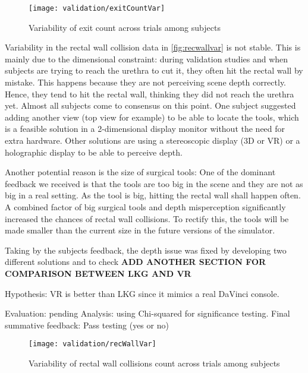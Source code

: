 \begin{figure}
  \centering
  \texttt{[image: validation/exitCountVar]}
  \caption{Variability of exit count across trials among subjects}
  \label{fig:exitvar}
\end{figure}

Variability in the rectal wall collision data in \autoref{fig:recwallvar} is not stable. This is mainly due to the dimensional constraint: during validation studies and when subjects are trying to reach the urethra to cut it, they often hit the rectal wall by mistake. This happens because they are not perceiving scene depth correctly. Hence, they tend to hit the rectal wall, thinking they did not reach the urethra yet. Almost all subjects come to consensus on this point. One subject suggested adding another view (top view for example) to be able to locate the tools, which is a feasible solution in a 2-dimensional display monitor without the need for extra hardware. Other solutions are using a stereoscopic display (3D or VR) or a holographic display to be able to perceive depth.

Another potential reason is the size of surgical tools: One of the dominant feedback we received is that the tools are too big in the scene and they are not as big in a real setting. As the tool is big, hitting the rectal wall shall happen often. A combined factor of big surgical tools and depth misperception significantly increased the chances of rectal wall collisions. To rectify this, the tools will be made smaller than the current size in the future versions of the simulator.

Taking by the subjects feedback, the depth issue was fixed by developing two different solutions and to check
\textbf{ADD ANOTHER SECTION FOR COMPARISON BETWEEN LKG AND VR}

Hypothesis: VR is better than LKG since it mimics a real DaVinci console.

Evaluation: pending
Analysis: using Chi-squared for significance testing.
Final summative feedback: Pass testing (yes or no)

\begin{figure}
  \centering
  \texttt{[image: validation/recWallVar]}
  \caption{Variability of rectal wall collisions count across trials among subjects}
  \label{fig:recwallvar}
\end{figure}


